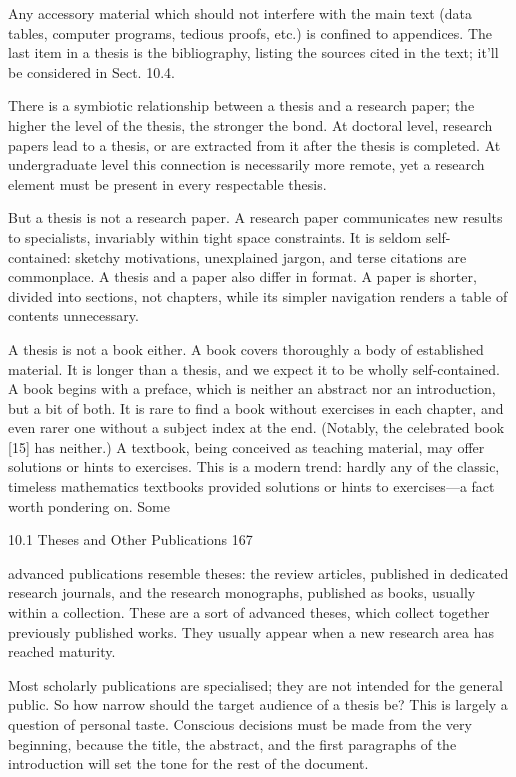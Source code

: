 \documentclass[11pt]{article}
\theoremstyle{plain}
\theoremstyle{definition}
\begin{document}
Any accessory material which should not interfere with the main text (data tables, computer programs, tedious proofs, etc.) is confined to appendices. The last item in a thesis is the bibliography, listing the sources cited in the text; it'll be considered in Sect. 10.4.

There is a symbiotic relationship between a thesis and a research paper; the higher the level of the thesis, the stronger the bond. At doctoral level, research papers lead to a thesis, or are extracted from it after the thesis is completed. At undergraduate level this connection is necessarily more remote, yet a research element must be present in every respectable thesis.

But a thesis is not a research paper. A research paper communicates new results to specialists, invariably within tight space constraints. It is seldom self-contained: sketchy motivations, unexplained jargon, and terse citations are commonplace. A thesis and a paper also differ in format. A paper is shorter, divided into sections, not chapters, while its simpler navigation renders a table of contents unnecessary.

A thesis is not a book either. A book covers thoroughly a body of established material. It is longer than a thesis, and we expect it to be wholly self-contained. A book begins with a preface, which is neither an abstract nor an introduction, but a bit of both. It is rare to find a book without exercises in each chapter, and even rarer one without a subject index at the end. (Notably, the celebrated book [15] has neither.) A textbook, being conceived as teaching material, may offer solutions or hints to exercises. This is a modern trend: hardly any of the classic, timeless mathematics textbooks provided solutions or hints to exercises---a fact worth pondering on. Some

10.1 Theses and Other Publications 167

advanced publications resemble theses: the review articles, published in dedicated research journals, and the research monographs, published as books, usually within a collection. These are a sort of advanced theses, which collect together previously published works. They usually appear when a new research area has reached maturity.

Most scholarly publications are specialised; they are not intended for the general public. So how narrow should the target audience of a thesis be? This is largely a question of personal taste. Conscious decisions must be made from the very beginning, because the title, the abstract, and the first paragraphs of the introduction will set the tone for the rest of the document.
\end{document}
